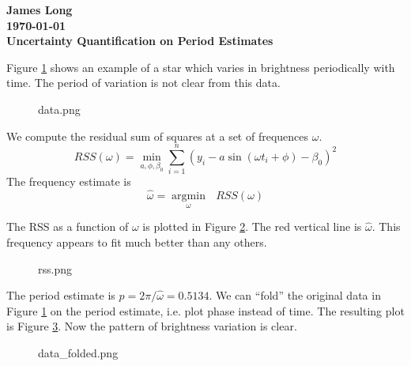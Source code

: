 \documentclass[12pt]{article}
\title{}
\date{}
\author{}
\newcommand{\argmin}[1]{\underset{#1}{\operatorname{argmin}}\text{ }}
\begin{document}
\noindent
\textbf{James Long}\\
\textbf{\today}\\
\textbf{Uncertainty Quantification on Period Estimates}

Figure \ref{fig:data} shows an example of a star which varies in brightness periodically with time. The period of variation is not clear from this data.

\begin{figure}[H]
  \begin{center}
    \begin{includegraphics}[scale=0.4]{data.png}
      \caption{\label{fig:data}}
    \end{includegraphics}
  \end{center}
\end{figure}

We compute the residual sum of squares at a set of frequences $\omega$.
\begin{equation*}
  RSS(\omega) = \min_{a,\phi,\beta_0} \sum_{i=1}^n (y_i - a\sin(\omega t_i + \phi) - \beta_0)^2
\end{equation*}
The frequency estimate is
\begin{equation*}
  \widehat{\omega} = \argmin{\omega} RSS(\omega)
\end{equation*}

The RSS as a function of $\omega$ is plotted in Figure \ref{fig:rss}. The red vertical line is $\widehat{\omega}$. This frequency appears to fit much better than any others.

  \begin{figure}[H]
    \begin{center}
      \begin{includegraphics}[scale=0.4]{rss.png}
        \caption{\label{fig:rss}}
      \end{includegraphics}
    \end{center}
  \end{figure}
  

  The period estimate is $p = 2\pi/\widehat{\omega} = 0.5134$. We can ``fold'' the original data in Figure \ref{fig:data} on the period estimate, i.e. plot phase instead of time. The resulting plot is Figure \ref{fig:data_folded}. Now the pattern of brightness variation is clear.

  \begin{figure}[H]
  \begin{center}
    \begin{includegraphics}[scale=0.4]{data_folded.png}
      \caption{\label{fig:data_folded}}
    \end{includegraphics}
  \end{center}
\end{figure}
\end{document}
